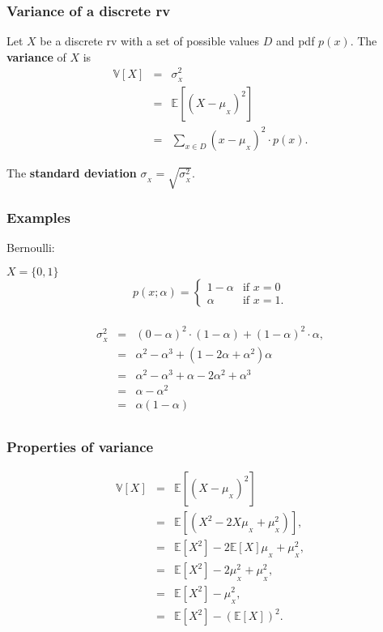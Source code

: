 \begin{frame}[fragile]\frametitle{Variance of a discrete rv}
\begin{defn}
Let $X$ be a discrete rv with a set of possible values $D$ and pdf
$p(x)$. The {\bf variance} of $X$ is
\begin{eqnarray*}
\mathbb V[X] &=& \sigma^2_{_X}\\ 
& =& \mathbb E[(X-\mu_{_X})^2]\\ 
&=& \sum_{x \in D} (x-\mu_{_X})^2 \cdot p(x). 
\end{eqnarray*}

The {\bf standard deviation} $\sigma_{_X} = \sqrt{\sigma^2_{_X}}$.
\end{defn}

\end{frame}



\begin{frame}[fragile]\frametitle{Examples}

Bernoulli:

$X = \{0,1\}$ \\
$$p(x;\alpha) = \left\{\begin{array}{ll}
			1-\alpha & \mbox{if } x =0 \\
			\alpha & \mbox{if } x=1
						   .	\end{array}
						\right. $$ 	 \\ 

\begin{eqnarray*}
\sigma^2_{_X}& =& (0-\alpha)^2 \cdot (1-\alpha) + (1-\alpha)^2 \cdot
\alpha, \\ 
 & = & \alpha^2-\alpha^3 + (1- 2 \alpha+ \alpha^2) \alpha \\ 
& = & \alpha^2 - \alpha^3 + \alpha - 2 \alpha^2 + \alpha^3 \\ 
& = & \alpha - \alpha^2  \\ 
& = & \alpha(1 - \alpha)  \\ 
\end{eqnarray*} 


\end{frame}




\begin{frame}[fragile]\frametitle{Properties of variance}

\begin{eqnarray*}
\mathbb V[X] &=& \mathbb E[(X-\mu_{_X})^2]\\ 
& =& \mathbb E[(X^2 -2 X \mu_{_X} + \mu^2_{_X})],\\ 
&=& \mathbb E[X^2]- 2 \mathbb E[X] \mu_{_X} + \mu^2_{_X}, \\ 
&=& \mathbb E[X^2]- 2 \mu^2_{_X} + \mu^2_{_X}, \\ 
&=& \mathbb E[X^2]- \mu^2_{_X}, \\ 
&=& \mathbb E[X^2]- (\mathbb E[X])^2.
\end{eqnarray*}


\end{frame}



